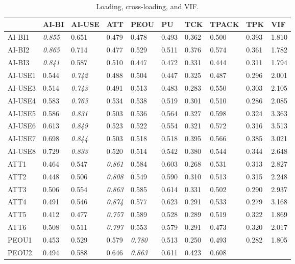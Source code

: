 \documentclass[english]{textolivre}
\begin{document}
\begin{table}[h!]
\centering
\begin{threeparttable}
\caption{Loading, cross-loading, and VIF.}
\label{tbl3}
\begin{tabular}{llllllllll}
\toprule
& AI-BI & AI-USE & ATT & PEOU & PU & TCK & TPACK & TPK & VIF \\
\midrule
AI-BI1 & \emph{0.855 } & 0.651 & 0.479 & 0.478 & 0.493 & 0.362 & 0.500 &
0.393 & 1.810  \\
AI-BI2 & \emph{0.865 } & 0.714 & 0.477 & 0.529 & 0.511 & 0.376 & 0.574 &
0.361 & 1.782  \\
AI-BI3 & \emph{0.841 } & 0.587 & 0.510 & 0.447 & 0.472 & 0.331 & 0.444 &
0.311 & 1.794  \\
AI-USE1 & 0.544 & \emph{0.742 } & 0.488 & 0.504 & 0.447 & 0.325 & 0.487
& 0.296 & 2.001  \\
AI-USE3 & 0.514 & \emph{0.743 } & 0.491 & 0.513 & 0.483 & 0.283 & 0.550
& 0.303 & 2.105  \\
AI-USE4 & 0.583 & \emph{0.763 } & 0.534 & 0.538 & 0.519 & 0.301 & 0.510
& 0.286 & 2.085  \\
AI-USE5 & 0.586 & \emph{0.831 } & 0.503 & 0.536 & 0.564 & 0.327 & 0.598
& 0.324 & 3.363  \\
AI-USE6 & 0.613 & \emph{0.849 } & 0.523 & 0.522 & 0.554 & 0.321 & 0.572
& 0.316 & 3.513  \\
AI-USE7 & 0.698 & \emph{0.844 } & 0.503 & 0.518 & 0.518 & 0.395 & 0.566
& 0.385 & 3.021  \\
AI-USE8 & 0.729 & \emph{0.833 } & 0.520 & 0.514 & 0.542 & 0.380 & 0.544
& 0.344 & 2.648  \\
ATT1 & 0.464 & 0.547 & \emph{0.861 } & 0.584 & 0.603 & 0.268 & 0.531 &
0.313 & 2.827  \\
ATT2 & 0.448 & 0.506 & \emph{0.808 } & 0.549 & 0.590 & 0.310 & 0.513 &
0.315 & 2.248  \\
ATT3 & 0.506 & 0.554 & \emph{0.863 } & 0.585 & 0.614 & 0.331 & 0.502 &
0.290 & 2.937  \\
ATT4 & 0.491 & 0.546 & \emph{0.874 } & 0.577 & 0.623 & 0.291 & 0.533 &
0.279 & 3.168  \\
ATT5 & 0.412 & 0.477 & \emph{0.757 } & 0.589 & 0.528 & 0.289 & 0.519 &
0.322 & 1.869  \\
ATT6 & 0.508 & 0.511 & \emph{0.797 } & 0.553 & 0.579 & 0.291 & 0.473 &
0.320 & 2.017  \\
PEOU1 & 0.453 & 0.529 & 0.579 & \emph{0.780 } & 0.513 & 0.250 & 0.493 &
0.282 & 1.805  \\
PEOU2 & 0.494 & 0.588 & 0.646 & \emph{0.863 } & 0.611 & 0.423 & 0.608 &

\end{tabular}
\end{threeparttable}
\end{table}
\end{document}
